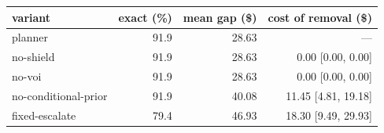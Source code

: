 \begin{tabular}{lrrr}
\toprule
variant & exact (\%) & mean gap (\$) & cost of removal (\$) \\
\midrule
planner & 91.9 & 28.63 & --- \\
no-shield & 91.9 & 28.63 & 0.00 [0.00, 0.00] \\
no-voi & 91.9 & 28.63 & 0.00 [0.00, 0.00] \\
no-conditional-prior & 91.9 & 40.08 & 11.45 [4.81, 19.18] \\
fixed-escalate & 79.4 & 46.93 & 18.30 [9.49, 29.93] \\
\bottomrule
\end{tabular}